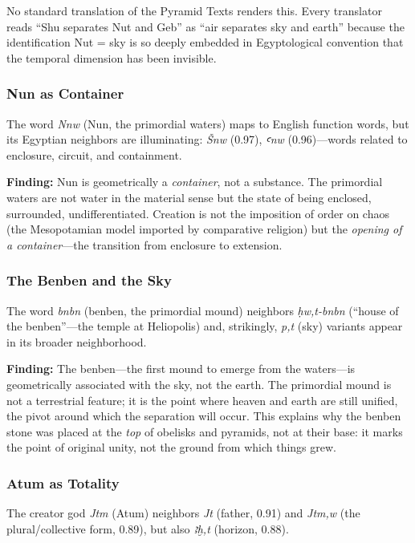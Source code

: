 \documentclass[11pt, a4paper]{article}
\begin{document}
No standard translation of the Pyramid Texts renders this. Every translator reads ``Shu separates Nut and Geb'' as ``air separates sky and earth'' because the identification Nut = sky is so deeply embedded in Egyptological convention that the temporal dimension has been invisible.

\subsubsection{Nun as Container}

The word \textit{Nnw} (Nun, the primordial waters) maps to English function words, but its Egyptian neighbors are illuminating: \textit{Šnw} (0.97), \textit{ꜥnw} (0.96)---words related to enclosure, circuit, and containment.

{\color{insight}\textbf{Finding:}} Nun is geometrically a \textit{container}, not a substance. The primordial waters are not water in the material sense but the state of being enclosed, surrounded, undifferentiated. Creation is not the imposition of order on chaos (the Mesopotamian model imported by comparative religion) but the \textit{opening of a container}---the transition from enclosure to extension.

\subsubsection{The Benben and the Sky}

The word \textit{bnbn} (benben, the primordial mound) neighbors \textit{ḥw,t-bnbn} (``house of the benben''---the temple at Heliopolis) and, strikingly, \textit{p,t} (sky) variants appear in its broader neighborhood.

{\color{insight}\textbf{Finding:}} The benben---the first mound to emerge from the waters---is geometrically associated with the sky, not the earth. The primordial mound is not a terrestrial feature; it is the point where heaven and earth are still unified, the pivot around which the separation will occur. This explains why the benben stone was placed at the \textit{top} of obelisks and pyramids, not at their base: it marks the point of original unity, not the ground from which things grew.

\subsubsection{Atum as Totality}

The creator god \textit{Jtm} (Atum) neighbors \textit{Jt} (father, 0.91) and \textit{Jtm,w} (the plural/collective form, 0.89), but also \textit{ꜣḫ,t} (horizon, 0.88).
\end{document}
